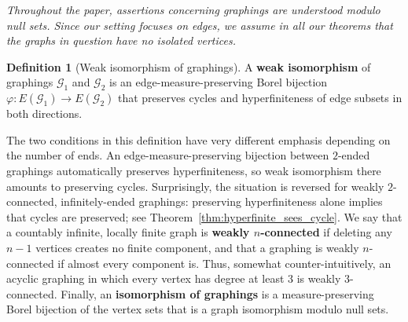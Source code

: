 \documentclass{article}
\theoremstyle{plain}
\theoremstyle{definition}
\newtheorem{defn}[thm]{Definition}
\newcommand{\cG}{\mathcal{G}}
\begin{document}
\textit{Throughout the paper, assertions concerning graphings are understood modulo null sets. Since our setting focuses on edges, we assume in all our theorems that the graphs in question have no isolated vertices.}

\begin{defn}[Weak isomorphism of graphings]\label{defn:weak_iso}
    A \textbf{weak isomorphism} of graphings $\cG_1$ and $\cG_2$ is an edge-measure-preserving Borel bijection $\varphi:E(\cG_1)\to E(\cG_2)$ that preserves cycles and hyperfiniteness of edge subsets in both directions.
\end{defn}

The two conditions in this definition have very different emphasis depending on the number of ends. An edge-measure-preserving bijection between $2$-ended graphings automatically preserves hyperfiniteness, so weak isomorphism there amounts to preserving cycles. Surprisingly, the situation is reversed for weakly $2$-connected, infinitely-ended graphings: preserving hyperfiniteness alone implies that cycles are preserved; see Theorem~\ref{thm:hyperfinite_sees_cycle}. 
We say that a countably infinite, locally finite graph is \textbf{weakly $n$-connected} if deleting any $n-1$ vertices creates no finite component, and that a graphing is weakly $n$-connected if almost every component is. Thus, somewhat counter-intuitively, an acyclic graphing in which every vertex has degree at least $3$ is weakly $3$-connected. Finally, an \textbf{isomorphism of graphings} is a measure-preserving Borel bijection of the vertex sets that is a graph isomorphism modulo null sets.
\end{document}
